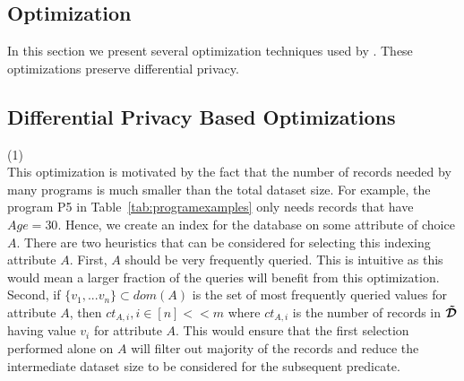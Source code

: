 \subsection{Optimization}\label{sec:optimization}
In this section we present several optimization techniques used by \system. These optimizations preserve differential privacy.
\subsection*{Differential Privacy Based Optimizations}
(1) \\
This optimization is motivated by the fact that the number of records needed by many programs is much smaller than the total dataset size.  For example, the program  P5 in Table~\ref{tab:programexamples} only needs records that have $Age=30$. Hence, we create an index for the database on some attribute of choice $A$. There are two heuristics that can be considered for selecting this indexing attribute $A$. First, $A$ should be very frequently queried. This is intuitive as this would mean a larger fraction of the queries will benefit from this optimization. Second, if $\{v_1,...v_n\} \subset dom(A)$ is the set of most frequently queried values for attribute $A$, then $ct_{A,i}, i \in [n] << m$ where $ct_{A,i}$ is the number of records in $\boldsymbol{\tilde{\mathcal{D}}}$ having value $v_i$ for attribute $A$. This would ensure that the first selection performed alone on $A$ will filter out majority of the records and reduce the intermediate dataset size to be considered for the subsequent predicate. 


